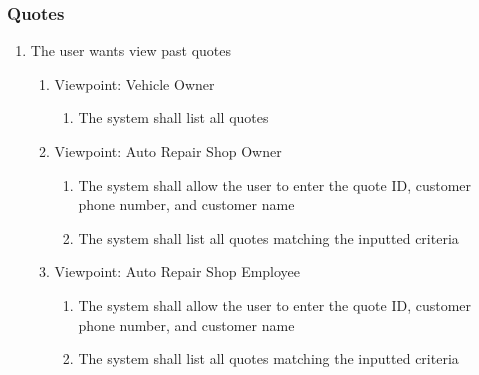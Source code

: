 \documentclass[12pt]{article}
\begin{document}
\subsubsection{Quotes}
\begin{enumerate}[resume*=business_events]
	\item The user wants view past quotes
	      \begin{enumerate}[VP\arabic*.]
		      \item Viewpoint: Vehicle Owner
		            \begin{enumerate}
			            \item The system shall list all quotes
		            \end{enumerate}
		      \item Viewpoint: Auto Repair Shop Owner
		            \begin{enumerate}
			            \item The system shall allow the user to enter the quote ID, customer phone number, and customer name
			            \item The system shall list all quotes matching the inputted criteria
		            \end{enumerate}
		      \item Viewpoint: Auto Repair Shop Employee
		            \begin{enumerate}
			            \item The system shall allow the user to enter the quote ID, customer phone number, and customer name
			            \item The system shall list all quotes matching the inputted criteria
		            \end{enumerate}
	      \end{enumerate}


\end{enumerate}
\end{document}
